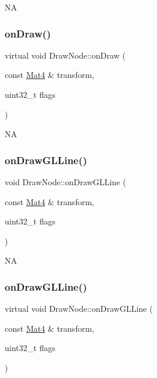 NA \mbox{\label{classDrawNode_ac634e7823879167ff1707108fbabb7df}} 
\subsubsection{\texorpdfstring{on\+Draw()}{onDraw()}\hspace{0.1cm}{\footnotesize\ttfamily [2/2]}}
{\footnotesize\ttfamily virtual void Draw\+Node\+::on\+Draw (\begin{DoxyParamCaption}\item[{const \hyperlink{classMat4}{Mat4} \&}]{transform,  }\item[{uint32\+\_\+t}]{flags }\end{DoxyParamCaption})\hspace{0.3cm}{\ttfamily [virtual]}}

NA \mbox{\label{classDrawNode_a19ecf575260b8db580cf78921cdd40ee}} 
\subsubsection{\texorpdfstring{on\+Draw\+G\+L\+Line()}{onDrawGLLine()}\hspace{0.1cm}{\footnotesize\ttfamily [1/2]}}
{\footnotesize\ttfamily void Draw\+Node\+::on\+Draw\+G\+L\+Line (\begin{DoxyParamCaption}\item[{const \hyperlink{classMat4}{Mat4} \&}]{transform,  }\item[{uint32\+\_\+t}]{flags }\end{DoxyParamCaption})\hspace{0.3cm}{\ttfamily [virtual]}}

NA \mbox{\label{classDrawNode_a21bb183a4a833a64c3b37ee102cae6b5}} 
\subsubsection{\texorpdfstring{on\+Draw\+G\+L\+Line()}{onDrawGLLine()}\hspace{0.1cm}{\footnotesize\ttfamily [2/2]}}
{\footnotesize\ttfamily virtual void Draw\+Node\+::on\+Draw\+G\+L\+Line (\begin{DoxyParamCaption}\item[{const \hyperlink{classMat4}{Mat4} \&}]{transform,  }\item[{uint32\+\_\+t}]{flags }\end{DoxyParamCaption})\hspace{0.3cm}{\ttfamily [virtual]}}

